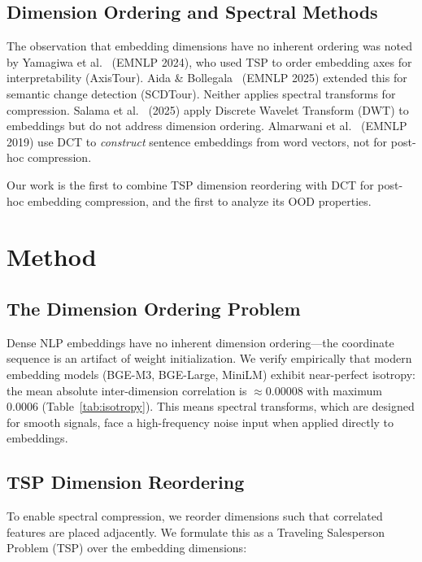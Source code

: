\documentclass[sigconf]{acmart}
\begin{document}
\subsection{Dimension Ordering and Spectral Methods}

The observation that embedding dimensions have no inherent ordering was noted by Yamagiwa et al.~\cite{yamagiwa2024axistour} (EMNLP 2024), who used TSP to order embedding axes for interpretability (AxisTour). Aida \& Bollegala~\cite{aida2025scdtour} (EMNLP 2025) extended this for semantic change detection (SCDTour). Neither applies spectral transforms for compression. Salama et al.~\cite{salama2025dwt} (2025) apply Discrete Wavelet Transform (DWT) to embeddings but do not address dimension ordering. Almarwani et al.~\cite{almarwani2019dct} (EMNLP 2019) use DCT to \emph{construct} sentence embeddings from word vectors, not for post-hoc compression.

Our work is the first to combine TSP dimension reordering with DCT for post-hoc embedding compression, and the first to analyze its OOD properties.

\section{Method}\label{sec:method}

\subsection{The Dimension Ordering Problem}\label{sec:dimorder}

Dense NLP embeddings have no inherent dimension ordering---the coordinate sequence is an artifact of weight initialization. We verify empirically that modern embedding models (BGE-M3, BGE-Large, MiniLM) exhibit near-perfect isotropy: the mean absolute inter-dimension correlation is $\approx 0.00008$ with maximum $0.0006$ (Table~\ref{tab:isotropy}). This means spectral transforms, which are designed for smooth signals, face a high-frequency noise input when applied directly to embeddings.

\subsection{TSP Dimension Reordering}\label{sec:tsp}

To enable spectral compression, we reorder dimensions such that correlated features are placed adjacently. We formulate this as a Traveling Salesperson Problem (TSP) over the embedding dimensions:
\end{document}
